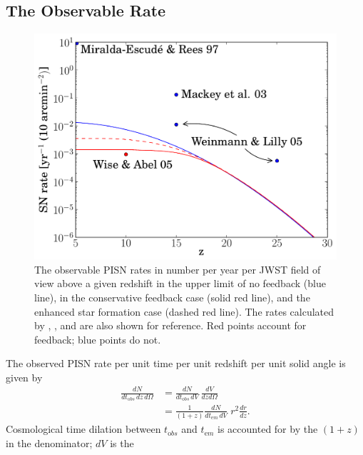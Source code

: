 \documentclass{thesis}
\begin{document}
\subsection{The Observable Rate}
\begin{figure}
 \begin{center}
   \includegraphics[width=\columnwidth]{observableRate}
   \caption{The observable PISN rates in number per year
     per JWST field of view above a given redshift in the upper limit
     of no feedback (blue line), in the conservative feedback case
     (solid red line), and the enhanced star formation case (dashed
     red line).  The rates calculated by
     \citet{Miralda-EscudeRees1997}, \citet{MackeyBrommHernquist2003},
     \citet{WeinmannLilly2005} and \citet{WiseAbel2005} are also shown
     for reference. Red points account for feedback; blue points do
     not.}
   \label{obsrate}
 \end{center}
\end{figure}
The observed PISN rate per unit time per unit redshift per unit solid
angle is given by
\begin{equation}
  \begin{split}
    \frac{dN}{dt_{\mathrm obs}\,dz\,d\Omega} &= \frac{dN}{dt_{\mathrm
        obs}\,dV} \, \frac{dV}{dz d\Omega}
    \\ &=\frac{1}{(1+z)}\frac{dN}{dt_{\mathrm em}\,dV} \;r^2
    \frac{dr}{dz}.
 \end{split}
\end{equation}
Cosmological time dilation between $t_{\mathrm obs}$ and $t_{\mathrm em}$ is
accounted for by the $(1+z)$ in the denominator; $dV$ is the
\end{document}
